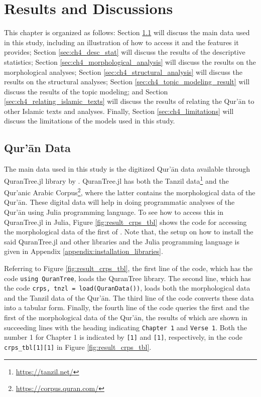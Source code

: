 \chapter{Results and Discussions}\label{ch:results}
This chapter is organized as follows: Section \ref{sec:result_data} will discuss the main data used in this study, including an illustration of how to access it and the features it provides; Section \ref{sec:ch4_desc_stat} will discuss the results of the descriptive statistics; Section \ref{sec:ch4_morphological_analysis} will discuss the results on the morphological analyses; Section \ref{sec:ch4_structural_analysis} will discuss the results on the structural analyses; Section \ref{sec:ch4_topic_modeling_result} will discuss the results of the topic modeling; and Section \ref{sec:ch4_relating_islamic_texts} will discuss the results of relating the Qur'\=an to other Islamic texts and analyses. Finally, Section \ref{sec:ch4_limitations} will discuss the limitations of the models used in this study.
\section{Qur'\=an Data}\label{sec:result_data}
The main data used in this study is the digitized Qur'\=an data available through QuranTree.jl library by . QuranTree.jl has both the Tanzil data\footnote{\url{https://tanzil.net/}} and the Qur'anic Arabic Corpus\footnote{\url{https://corpus.quran.com/}}, where the latter contains the morphological data of the Qur'\=an. These digital data will help in doing programmatic analyses of the Qur'\=an using Julia programming language. To see how to access this in QuranTree.jl in Julia, Figure \ref{fig:result_crps_tbl} shows the code for accessing the morphological data of the first   of  . Note that, the setup on how to install the said QuranTree.jl and other libraries and the Julia programming language is given in Appendix \ref{appendix:installation_libraries}.

Referring to Figure \ref{fig:result_crps_tbl}, the first line of the code, which has the code \texttt{using QuranTree}, loads the QuranTree library. The second line, which has the code \texttt{crps, tnzl = load(QuranData())}, loads both the morphological data and the Tanzil data of the Qur'\=an. The third line of the code converts these data into a tabular form. Finally, the fourth line of the code queries the first   and the first   of the morphological data of the Qur'\=an, the results of which are shown in succeeding lines with the heading indicating \texttt{Chapter 1} and \texttt{Verse 1}. Both the number 1 for Chapter 1 is indicated by \texttt{[1]} and \texttt{[1]}, respectively, in the code \verb|crps_tbl[1][1]| in Figure \ref{fig:result_crps_tbl}.

